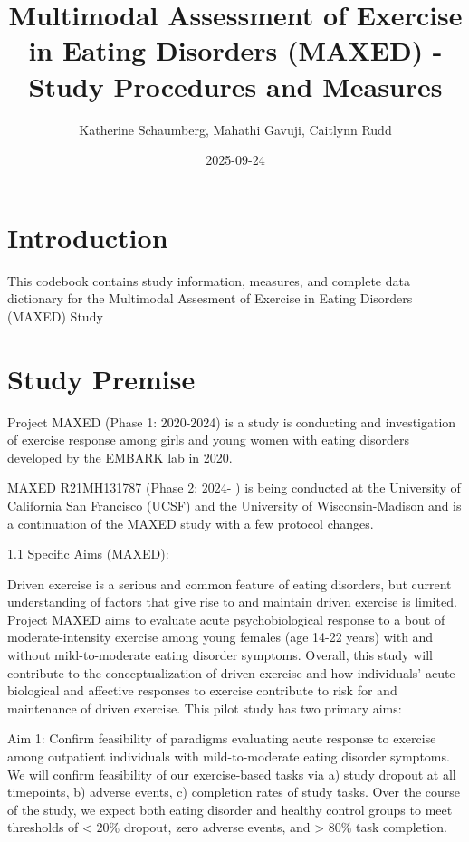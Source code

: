 \documentclass[
]{book}
\title{Multimodal Assessment of Exercise in Eating Disorders (MAXED) - Study Procedures and Measures}
\author{Katherine Schaumberg, Mahathi Gavuji, Caitlynn Rudd}
\date{2025-09-24}
\begin{document}
\maketitle

{
\setcounter{tocdepth}{1}
\tableofcontents
}
\chapter{Introduction}\label{introduction}

This codebook contains study information, measures, and complete data dictionary for the Multimodal Assesment of Exercise in Eating Disorders (MAXED) Study

\chapter{Study Premise}\label{study-premise}

Project MAXED (Phase 1: 2020-2024) is a study is conducting and investigation of exercise response among girls and young women with eating disorders developed by the EMBARK lab in 2020.

MAXED R21MH131787 (Phase 2: 2024- ) is being conducted at the University of California San Francisco (UCSF) and the University of Wisconsin-Madison and is a continuation of the MAXED study with a few protocol changes.

1.1 Specific Aims (MAXED):

Driven exercise is a serious and common feature of eating disorders, but current understanding of factors that give rise to and maintain driven exercise is limited.
Project MAXED aims to evaluate acute psychobiological response to a bout of moderate-intensity exercise among young females (age 14-22 years) with and without mild-to-moderate eating disorder symptoms.
Overall, this study will contribute to the conceptualization of driven exercise and how individuals' acute biological and affective responses to exercise contribute to risk for and maintenance of driven exercise.
This pilot study has two primary aims:

Aim 1: Confirm feasibility of paradigms evaluating acute response to exercise among outpatient individuals with mild-to-moderate eating disorder symptoms.
We will confirm feasibility of our exercise-based tasks via a) study dropout at all timepoints, b) adverse events, c) completion rates of study tasks.
Over the course of the study, we expect both eating disorder and healthy control groups to meet thresholds of \textless{} 20\% dropout, zero adverse events, and \textgreater{} 80\% task completion.
\end{document}
